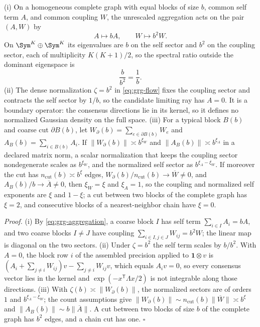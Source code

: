(i) On a homogeneous complete graph with equal blocks of size \(b\), common
self term \(A\), and common coupling \(W\), the unrescaled aggregation acts on
the pair \((A,W)\) by
\begin{equation}
A\longmapsto bA,\qquad W\longmapsto b^2W.
\label{eq:grg-homogeneous-map}
\end{equation}
On \(\Sym^K\oplus\Sym^K\) its eigenvalues are \(b\) on the self sector and
\(b^2\) on the coupling sector, each of multiplicity \(K(K+1)/2\), so the
spectral ratio outside the dominant eigenspace is
\begin{equation}
\frac{b}{b^2}=\frac1b.
\label{eq:grg-sector-gap}
\end{equation}
(ii) The dense normalization \(\zeta=b^2\) in \eqref{eq:grg-flow} fixes the
coupling sector and contracts the self sector by \(1/b\), so the candidate
limiting ray has \(A=0\). It is a boundary operator: the consensus directions
lie in its kernel, so it defines no normalized Gaussian density on the full
space. (iii) For a typical block \(B(b)\) and coarse cut \(\partial B(b)\), let
\(W_\partial(b)=\sum_{e\in\partial B(b)}W_e\) and
\(A_B(b)=\sum_{i\in B(b)}A_i\). If
\(\lVert W_\partial(b)\rVert\asymp b^{\xi_W}\) and
\(\lVert A_B(b)\rVert\asymp b^{\xi_A}\) in a declared matrix norm, a scalar
normalization that keeps the coupling sector nondegenerate scales as
\(b^{\xi_W}\), and the normalized self sector as \(b^{\xi_A-\xi_W}\). If
moreover the cut has \(n_{\mathrm{cut}}(b)\asymp b^\xi\) edges,
\(W_\partial(b)/n_{\mathrm{cut}}(b)\to\overline W\neq0\), and
\(A_B(b)/b\to\overline A\neq0\), then \(\xi_W=\xi\) and \(\xi_A=1\), so the
coupling and normalized self exponents are \(\xi\) and \(1-\xi\); a cut between
two blocks of the complete graph has \(\xi=2\), and consecutive blocks of a
nearest-neighbor chain have \(\xi=0\). 

\noindent\emph{Proof.}
(i) By \eqref{eq:grg-aggregation}, a coarse block \(I\) has self term
\(\sum_{i\in I}A_i=bA\), and two coarse blocks \(I\neq J\) have coupling
\(\sum_{i\in I,j\in J}W_{ij}=b^2W\); the linear map is diagonal on the two
sectors. (ii) Under \(\zeta=b^2\) the self term scales by \(b/b^2\). With
\(A=0\), the block row \(i\) of the assembled precision applied to
\(\mathbf1\otimes v\) is
\((A_i+\sum_{j\neq i}W_{ij})v-\sum_{j\neq i}W_{ij}v\), which equals
\(A_iv=0\), so every
consensus vector lies in the kernel and \(\exp(-x^{\mathsf T}\Lambda x/2)\) is
not integrable along those directions. (iii) With \(\zeta(b)\asymp
\lVert W_\partial(b)\rVert\), the normalized sectors are of orders \(1\) and
\(b^{\xi_A-\xi_W}\); the count assumptions give
\(\lVert W_\partial(b)\rVert\sim n_{\mathrm{cut}}(b)\lVert\overline W\rVert\asymp
b^\xi\) and \(\lVert A_B(b)\rVert\sim b\lVert\overline A\rVert\). A cut between
two blocks of size \(b\) of the complete graph has \(b^2\) edges, and a chain
cut has one. \(\square\)

